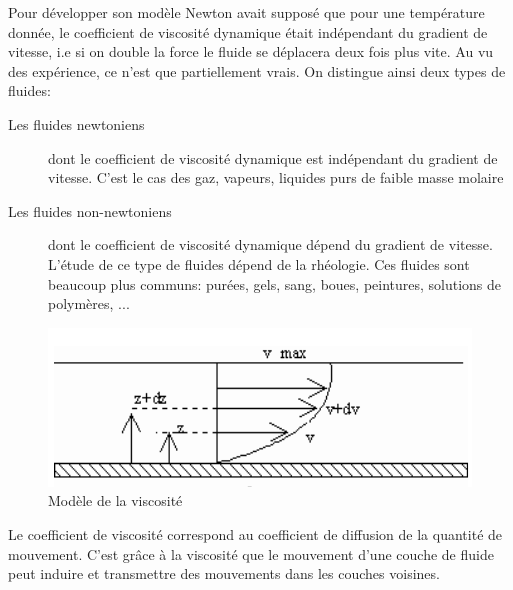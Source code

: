 \documentclass[10pt,a4paper]{article}
\begin{document}
Pour développer son modèle Newton avait supposé que pour une température donnée, le coefficient de viscosité dynamique était indépendant du gradient de vitesse, i.e si on double la force le fluide se déplacera deux fois plus vite. Au vu des expérience, ce n'est que partiellement vrais. On distingue ainsi deux types de fluides:
\begin{description}
\item[Les fluides newtoniens] dont le coefficient de viscosité dynamique est indépendant du gradient de vitesse. C'est le cas des gaz, vapeurs, liquides purs de faible masse molaire
\item[Les fluides non-newtoniens] dont le coefficient de viscosité dynamique dépend du gradient de vitesse. L'étude de ce type de fluides dépend de la rhéologie. Ces fluides sont beaucoup plus communs: purées, gels, sang, boues, peintures, solutions de polymères, ...
\end{description}

\begin{figure}
\centering
\includegraphics[scale=0.5]{viscodyna}
\caption{Modèle de la viscosité}
\label{fig:viscodyna}
\end{figure}

Le coefficient de viscosité correspond au coefficient de diffusion de la quantité de mouvement. C'est grâce à la viscosité que le mouvement d'une couche de fluide peut induire et transmettre des mouvements dans les couches voisines.
\end{document}
